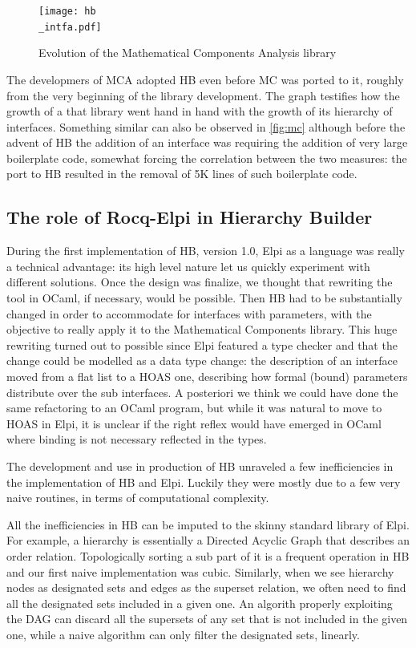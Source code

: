 \documentclass[a4paper, 11pt]{book}
\begin{document}
\begin{figure}[!hb]
\texttt{[image: hb\\\_intfa.pdf]}
\caption{Evolution of the Mathematical Components Analysis library\label{fig:mca}}
\end{figure}

The developmers of MCA adopted HB even before MC was ported to it, roughly from
the very beginning of the library development. The graph testifies how
the growth of a that library went hand in hand with the growth of
its hierarchy of interfaces. Something similar can also be observed in
\cref{fig:mc} although before the advent of HB the addition of an interface
was requiring the addition of very large boilerplate code, somewhat forcing
the correlation between the two measures: the port to HB resulted in the
removal of 5K lines of such boilerplate code.

\subsection{The role of Rocq-Elpi in Hierarchy Builder}

During the first implementation of HB, version 1.0, Elpi as a language was
really a technical advantage: its high level nature let us quickly experiment
with different solutions. Once the design was finalize, we thought that rewriting
the tool in OCaml, if necessary, would be possible. Then HB had to be substantially
changed in order to accommodate for interfaces with parameters, with the objective
to really apply it to the Mathematical Components library. This huge rewriting
turned out to possible since Elpi featured a type checker and that the change
could be modelled as a data type change: the description of an interface moved from
a flat list to a HOAS one, describing how formal (bound) parameters distribute over
the sub interfaces. A posteriori we think we could have done the same
refactoring to an OCaml program, but while it was natural to move to HOAS
in Elpi, it is unclear if the right reflex would have emerged in OCaml where
binding is not necessary reflected in the types.

The development and use in production of HB unraveled a few inefficiencies
in the implementation of HB and Elpi. Luckily they were mostly due to
a few very naive routines, in terms of computational complexity.

All the inefficiencies in HB can be imputed to the skinny standard library
of Elpi. For example, a hierarchy is essentially a Directed Acyclic Graph that
describes an order relation. Topologically sorting a sub part of it is a
frequent operation in HB and our first naive implementation was cubic.
Similarly, when we see hierarchy nodes as designated sets and
edges as the superset relation, we often need to find all the designated
sets included in a given one. An algorith properly exploiting the DAG
can discard all the supersets of any set that is not included in the given one,
while a naive algorithm can only filter the designated sets, linearly.
\end{document}

